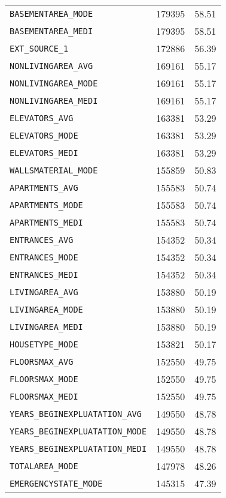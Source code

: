 \documentclass[12pt, a4paper]{article}
\begin{document}
\begin{longtable}{@{}lll@{}}
\verb|BASEMENTAREA_MODE|           &179395 &58.51  \\
\verb|BASEMENTAREA_MEDI|           &179395 &58.51  \\
\verb|EXT_SOURCE_1|                &172886 &56.39  \\
\verb|NONLIVINGAREA_AVG|           &169161 &55.17  \\
\verb|NONLIVINGAREA_MODE|          &169161 &55.17  \\
\verb|NONLIVINGAREA_MEDI|          &169161 &55.17  \\
\verb|ELEVATORS_AVG|               &163381 &53.29  \\
\verb|ELEVATORS_MODE|              &163381 &53.29  \\
\verb|ELEVATORS_MEDI|              &163381 &53.29  \\
\verb|WALLSMATERIAL_MODE|          &155859 &50.83  \\
\verb|APARTMENTS_AVG|              &155583 &50.74  \\
\verb|APARTMENTS_MODE|             &155583 &50.74  \\
\verb|APARTMENTS_MEDI|             &155583 &50.74  \\
\verb|ENTRANCES_AVG|               &154352 &50.34  \\
\verb|ENTRANCES_MODE|              &154352 &50.34  \\
\verb|ENTRANCES_MEDI|              &154352 &50.34  \\
\verb|LIVINGAREA_AVG|              &153880 &50.19  \\
\verb|LIVINGAREA_MODE|             &153880 &50.19  \\
\verb|LIVINGAREA_MEDI|             &153880 &50.19  \\
\verb|HOUSETYPE_MODE|              &153821 &50.17  \\
\verb|FLOORSMAX_AVG|               &152550 &49.75  \\
\verb|FLOORSMAX_MODE|              &152550 &49.75  \\
\verb|FLOORSMAX_MEDI|              &152550 &49.75  \\
\verb|YEARS_BEGINEXPLUATATION_AVG| &149550 &48.78  \\
\verb|YEARS_BEGINEXPLUATATION_MODE|&149550 &48.78  \\
\verb|YEARS_BEGINEXPLUATATION_MEDI|&149550 &48.78  \\
\verb|TOTALAREA_MODE|              &147978 &48.26  \\
\verb|EMERGENCYSTATE_MODE|         &145315 &47.39  \\
\end{longtable}
\end{document}
